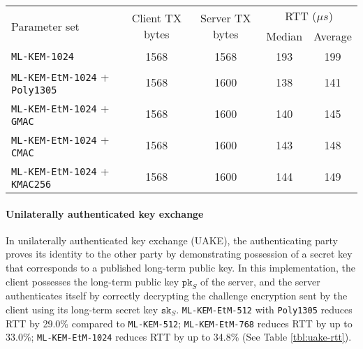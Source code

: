 \documentclass[runningheads]{llncs}
\newcommand{\pk}{\texttt{pk}}
\newcommand{\sk}{\texttt{sk}}
\newcommand{\us}{\mu s}
\begin{document}
\begin{table}[h]
    \begin{tabular}{|p{14em}|c|c|c|c|}
        \hline
        \multirow{2}{*}{Parameter set}
        & \multirow{2}{*}{Client TX bytes}
        & \multirow{2}{*}{Server TX bytes}
        & \multicolumn{2}{|c|}{RTT ($\us$)} \\
        \cline{4-5}
        & & & Median & Average \\
        \hline
        \texttt{ML-KEM-1024} & 1568 & 1568 & 193 & 199 \\
        \hline
        \texttt{ML-KEM-EtM-1024} + \texttt{Poly1305} & 1568 & 1600 & 138 & 141 \\
        \hline
        \texttt{ML-KEM-EtM-1024} + \texttt{GMAC} & 1568 & 1600 & 140 & 145 \\
        \hline
        \texttt{ML-KEM-EtM-1024} + \texttt{CMAC} & 1568 & 1600 & 143 & 148 \\
        \hline
        \texttt{ML-KEM-EtM-1024} + \texttt{KMAC256} & 1568 & 1600 & 144 & 149 \\
        \hline
    \end{tabular}
\end{table}

\paragraph{Unilaterally authenticated key exchange}
In unilaterally authenticated key exchange (UAKE), the authenticating party proves its identity to the other party by demonstrating possession of a secret key that corresponds to a published long-term public key. In this implementation, the client possesses the long-term public key $\pk_S$ of the server, and the server authenticates itself by correctly decrypting the challenge encryption sent by the client using its long-term secret key $\sk_S$. \texttt{ML-KEM-EtM-512} with \texttt{Poly1305} reduces RTT by 29.0\% compared to \texttt{ML-KEM-512}; \texttt{ML-KEM-EtM-768} reduces RTT by up to 33.0\%; \texttt{ML-KEM-EtM-1024} reduces RTT by up to 34.8\% (See Table \ref{tbl:uake-rtt}).
\end{document}
